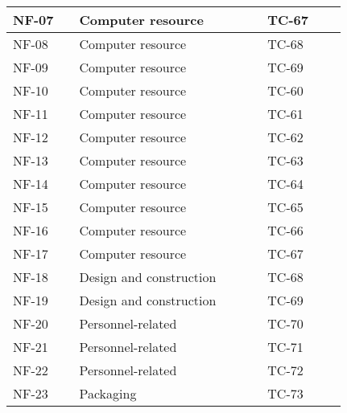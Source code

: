 \begin{sidewaystable}
\begin{longtable}{| p{1.1cm}  | p{2cm}  | p{5cm} |  p{1.5cm}  | p{1.5cm}  |  p{1.5cm}  | p{1.5cm}  |  p{1.5cm}  | p{2cm}  |  }
		NF-07&& Computer resource&&&& TC-67 && \\ \hline
		NF-08&& Computer resource&&&& TC-68 && \\ \hline
		NF-09&& Computer resource&&&& TC-69 && \\ \hline
		NF-10&& Computer resource&&&& TC-60 && \\ \hline
		NF-11&& Computer resource&&&& TC-61 && \\ \hline
		NF-12&& Computer resource&&&& TC-62 && \\ \hline
		NF-13&& Computer resource&&&& TC-63 && \\ \hline
		NF-14&& Computer resource&&&& TC-64 && \\ \hline
		NF-15&& Computer resource&&&& TC-65 && \\ \hline
		NF-16&& Computer resource&&&& TC-66 && \\ \hline
		NF-17&& Computer resource&&&& TC-67 && \\ \hline
		NF-18&& Design and construction&&&& TC-68 && \\ \hline
		NF-19&& Design and construction&&&& TC-69 && \\ \hline
		NF-20&& Personnel-related&&&& TC-70 && \\ \hline
		NF-21&& Personnel-related&&&& TC-71 && \\ \hline
		NF-22&& Personnel-related&&&& TC-72 && \\ \hline
		NF-23&& Packaging&&&& TC-73 && \\ \hline
	\end{longtable}
\end{sidewaystable}